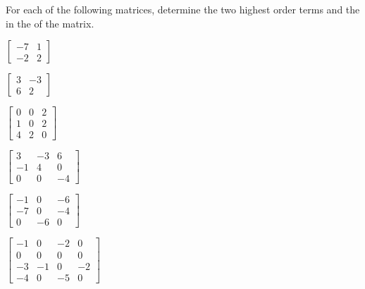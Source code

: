 \begin{exercise}  
For each of the following matrices, determine the two highest order terms and the  in the  of the matrix.
\begin{Parts}
\item \(\begin{bmatrix} -7 & 1
\\-2 & 2 \end{bmatrix}\)

\item \(\begin{bmatrix} 3 & -3
\\6 & 2 \end{bmatrix}\)

\item \(\begin{bmatrix} 0 & 0 & 2
\\1 & 0 & 2
\\4 & 2 & 0 \end{bmatrix}\)

\item \(\begin{bmatrix} 3 & -3 & 6
\\-1 & 4 & 0
\\0 & 0 & -4 \end{bmatrix}\)

\begin{reduce}
\item \(\begin{bmatrix} -1 & 0 & -6
\\-7 & 0 & -4
\\0 & -6 & 0 \end{bmatrix}\)

\item \(\begin{bmatrix} -1 & 0 & -2 & 0
\\0 & 0 & 0 & 0
\\-3 & -1 & 0 & -2
\\-4 & 0 & -5 & 0 \end{bmatrix}\)
\end{reduce}


\end{Parts}
\end{exercise}
